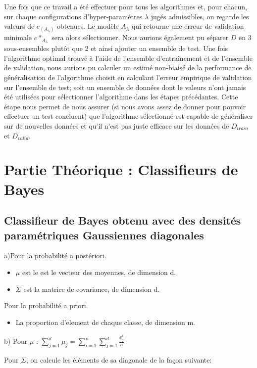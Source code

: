 \documentclass[a4paper,10pt]{article}
\begin{document}
Une fois que ce travail a été effectuer pour tous les algorithmes et, pour chacun, sur chaque configurations d'hyper-paramètres $\lambda$ jugés admissibles, on regarde les valeurs de $e_{(A_{\lambda})}$ obtenues. Le modèle $A_{\lambda}$ qui retourne une erreur de validation minimale $e*_{A_{\lambda}}$ sera alors sélectionner. 
Nous aurions également pu séparer $D$ en 3 sous-ensembles plutôt que 2 et ainsi ajouter un ensemble de test. Une fois l'algorithme optimal trouvé à l'aide de l'ensemble d'entraînement et de l'ensemble de validation, nous aurions pu calculer un estimé non-biaisé de la performance de généralisation de l'algorithme choisit en calculant l'erreur empirique de validation sur l'ensemble de test; soit un ensemble de données dont le valeurs n'ont jamais été utilisées pour sélectionner l'algorithme dans les étapes précédantes. Cette étape nous permet de nous assurer (si nous avons assez de donner pour pouvoir effectuer un test concluent) que l'algorithme sélectionné est capable de généraliser sur de nouvelles données et qu'il n'est pas juste efficace sur les données de $D_{train}$ et $D_{valid}$.



\section{Partie Théorique : Classifieurs de Bayes}

\subsection{Classifieur de Bayes obtenu avec des densités paramétriques Gaussiennes diagonales}

a)Pour la probabilité a postériori.
\begin{itemize}
	\item $\mu$ est le est le vecteur des moyennes, de dimension d.
	\item $\Sigma$ est la matrice de covariance, de dimension d.
\end{itemize}
Pour la probabilité a priori.
\begin{itemize}
	\item La proportion d'element de chaque classe, de dimension m.
\end{itemize}

b)
Pour $\mu$ :
$\sum_{j=1}^{d} \mu_{j} = \sum_{i=1}^{n}\sum_{j=1}^{d} \frac{x_{j}^{i}}{n}$

Pour $\Sigma$, on calcule les éléments de sa diagonale de la façon suivante:
\end{document}
